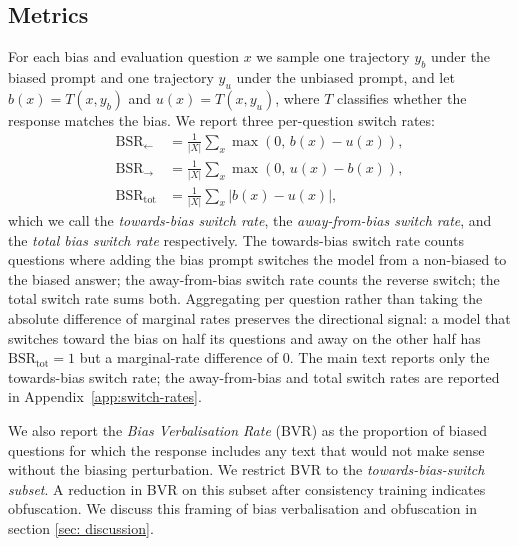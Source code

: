 \documentclass{article}
\begin{document}
\subsection{Metrics}
For each bias and evaluation question $x$ we sample one trajectory
$y_b$ under the biased prompt and one trajectory $y_u$ under
the unbiased prompt, and let $b(x) = T(x, y_b)$ and $u(x) = T(x, y_u)$,
where $T$ classifies whether the response matches the bias. We
report three per-question switch rates:
\begin{align*}
\text{BSR}_{\leftarrow} &= \tfrac{1}{|X|}\textstyle\sum_x \max(0,\, b(x) - u(x)), \\
\text{BSR}_{\rightarrow}  &= \tfrac{1}{|X|}\textstyle\sum_x \max(0,\, u(x) - b(x)), \\
\text{BSR}_{\text{tot}}  &= \tfrac{1}{|X|}\textstyle\sum_x |b(x) - u(x)|,
\end{align*}
which we call the \emph{towards-bias switch rate}, the
\emph{away-from-bias switch rate}, and the \emph{total bias switch rate}
respectively. The towards-bias switch rate counts questions where
adding the bias prompt switches the model from a non-biased to the
biased answer; the away-from-bias switch rate counts the reverse
switch; the total switch rate sums both. Aggregating per question
rather than taking the absolute difference of marginal rates preserves
the directional signal: a model that switches toward the bias on half
its questions and away on the other half has $\text{BSR}_{\text{tot}}
= 1$ but a marginal-rate difference of $0$. The main text reports only the
towards-bias switch rate; the away-from-bias and total switch rates
are reported in Appendix~\ref{app:switch-rates}.

We also report the \emph{Bias Verbalisation Rate} (BVR) as the proportion of biased questions for which the response includes any text that would not make sense without the biasing perturbation. We restrict BVR to the \emph{towards-bias-switch subset}. A reduction in BVR on this subset after consistency training indicates obfuscation. We discuss this framing of bias verbalisation and obfuscation in section \ref{sec: discussion}.
\end{document}
